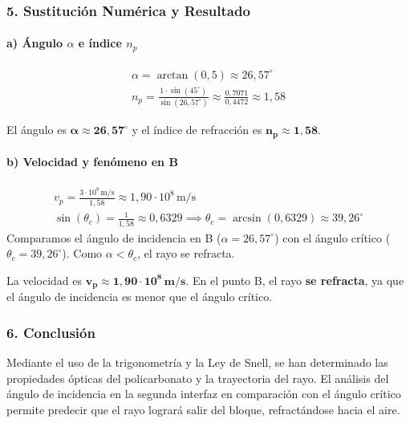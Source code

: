\subsubsection*{5. Sustitución Numérica y Resultado}
\paragraph{a) Ángulo $\alpha$ e índice $n_p$}
\begin{gather}
    \alpha = \arctan(0,5) \approx 26,57^\circ \\
    n_p = \frac{1 \cdot \sin(45^\circ)}{\sin(26,57^\circ)} \approx \frac{0,7071}{0,4472} \approx 1,58
\end{gather}
\begin{cajaresultado}
El ángulo es $\boldsymbol{\alpha \approx 26,57^\circ}$ y el índice de refracción es $\boldsymbol{n_p \approx 1,58}$.
\end{cajaresultado}
\paragraph{b) Velocidad y fenómeno en B}
\begin{gather}
    v_p = \frac{3\cdot10^8\,\text{m/s}}{1,58} \approx 1,90\cdot10^8\,\text{m/s} \\
    \sin(\theta_c) = \frac{1}{1,58} \approx 0,6329 \implies \theta_c = \arcsin(0,6329) \approx 39,26^\circ
\end{gather}
Comparamos el ángulo de incidencia en B ($\alpha=26,57^\circ$) con el ángulo crítico ($\theta_c=39,26^\circ$). Como $\alpha < \theta_c$, el rayo se refracta.
\begin{cajaresultado}
La velocidad es $\boldsymbol{v_p \approx 1,90\cdot10^8\,\textbf{m/s}}$. En el punto B, el rayo \textbf{se refracta}, ya que el ángulo de incidencia es menor que el ángulo crítico.
\end{cajaresultado}
\subsubsection*{6. Conclusión}
\begin{cajaconclusion}
Mediante el uso de la trigonometría y la Ley de Snell, se han determinado las propiedades ópticas del policarbonato y la trayectoria del rayo. El análisis del ángulo de incidencia en la segunda interfaz en comparación con el ángulo crítico permite predecir que el rayo logrará salir del bloque, refractándose hacia el aire.
\end{cajaconclusion}
\newpage

